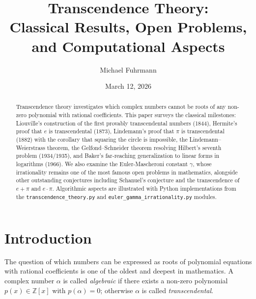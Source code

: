 \documentclass[12pt,a4paper]{amsart}
\theoremstyle{definition}
\begin{document}
\title{Transcendence Theory:\\
Classical Results, Open Problems, and Computational Aspects}
\author{Michael Fuhrmann}
\address{Specialist Mathematics Project, Build 141}
\date{March 12, 2026}

\begin{abstract}
Transcendence theory investigates which complex numbers cannot be roots of any
non-zero polynomial with rational coefficients. This paper surveys the classical
milestones: Liouville's construction of the first provably transcendental numbers
(1844), Hermite's proof that $e$ is transcendental (1873), Lindemann's proof
that $\pi$ is transcendental (1882) with the corollary that squaring the circle
is impossible, the Lindemann--Weierstrass theorem, the Gelfond--Schneider
theorem resolving Hilbert's seventh problem (1934/1935), and Baker's
far-reaching generalization to linear forms in logarithms (1966).
We also examine the Euler-Mascheroni constant $\gamma$, whose irrationality
remains one of the most famous open problems in mathematics, alongside other
outstanding conjectures including Schanuel's conjecture and the transcendence
of $e + \pi$ and $e \cdot \pi$. Algorithmic aspects are illustrated with
Python implementations from the \texttt{transcendence\_theory.py} and
\texttt{euler\_gamma\_irrationality.py} modules.
\end{abstract}

\maketitle

\tableofcontents

\section{Introduction}

The question of which numbers can be expressed as roots of polynomial equations
with rational coefficients is one of the oldest and deepest in mathematics.
A complex number $\alpha$ is called \emph{algebraic} if there exists a non-zero
polynomial $p(x) \in \mathbb{Z}[x]$ with $p(\alpha) = 0$; otherwise $\alpha$
is called \emph{transcendental}.
\end{document}
